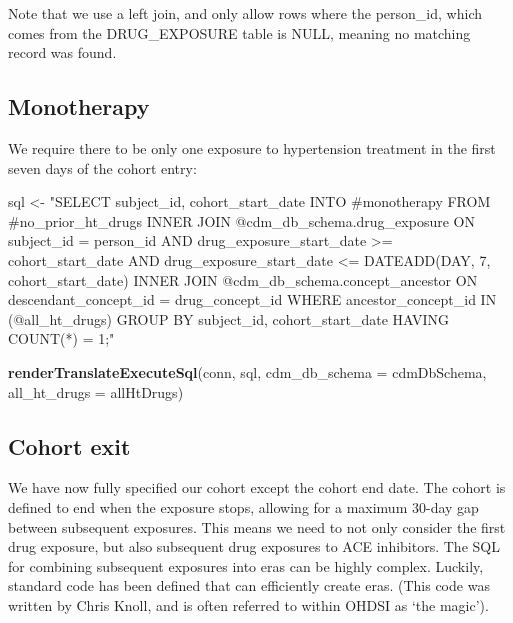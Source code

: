 \documentclass[11pt]{book}
\newenvironment{Shaded}{\begin{snugshade}}{\end{snugshade}}
\newcommand{\DataTypeTok}[1]{\textcolor[rgb]{0.13,0.29,0.53}{#1}}
\newcommand{\KeywordTok}[1]{\textcolor[rgb]{0.13,0.29,0.53}{\textbf{#1}}}
\newcommand{\NormalTok}[1]{#1}
\newcommand{\StringTok}[1]{\textcolor[rgb]{0.31,0.60,0.02}{#1}}
\theoremstyle{definition}
\theoremstyle{definition}
\theoremstyle{definition}
\theoremstyle{remark}
\begin{document}
Note that we use a left join, and only allow rows where the person\_id, which comes from the DRUG\_EXPOSURE table is NULL, meaning no matching record was found.

\hypertarget{monotherapy}{%
\subsection{Monotherapy}\label{monotherapy}}

We require there to be only one exposure to hypertension treatment in the first seven days of the cohort entry:

\begin{Shaded}
\begin{Highlighting}[]
\NormalTok{sql <-}\StringTok{ "SELECT subject_id,}
\StringTok{  cohort_start_date}
\StringTok{INTO #monotherapy}
\StringTok{FROM #no_prior_ht_drugs}
\StringTok{INNER JOIN @cdm_db_schema.drug_exposure}
\StringTok{  ON subject_id = person_id}
\StringTok{    AND drug_exposure_start_date >= cohort_start_date}
\StringTok{    AND drug_exposure_start_date <= DATEADD(DAY, 7, cohort_start_date)}
\StringTok{INNER JOIN @cdm_db_schema.concept_ancestor}
\StringTok{  ON descendant_concept_id = drug_concept_id}
\StringTok{WHERE ancestor_concept_id IN (@all_ht_drugs)}
\StringTok{GROUP BY subject_id,}
\StringTok{  cohort_start_date}
\StringTok{HAVING COUNT(*) = 1;"}

\KeywordTok{renderTranslateExecuteSql}\NormalTok{(conn, sql, }\DataTypeTok{cdm_db_schema =}\NormalTok{ cdmDbSchema, }\DataTypeTok{all_ht_drugs =}\NormalTok{ allHtDrugs)}
\end{Highlighting}
\end{Shaded}

\hypertarget{cohort-exit}{%
\subsection{Cohort exit}\label{cohort-exit}}

We have now fully specified our cohort except the cohort end date. The cohort is defined to end when the exposure stops, allowing for a maximum 30-day gap between subsequent exposures. This means we need to not only consider the first drug exposure, but also subsequent drug exposures to ACE inhibitors. The SQL for combining subsequent exposures into eras can be highly complex. Luckily, standard code has been defined that can efficiently create eras. (This code was written by Chris Knoll, and is often referred to within OHDSI as `the magic').
\end{document}

